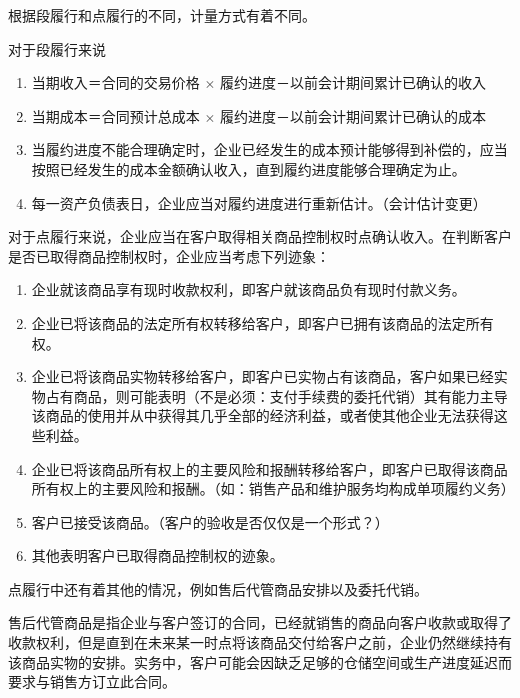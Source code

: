 \documentclass[UTF8,12pt]{ctexart}
\numberwithin{equation}{section} %
\numberwithin{figure}{section}
\numberwithin{table}{section}
\begin{document}
	根据段履行和点履行的不同，计量方式有着不同。
	
	对于段履行来说
	\begin{enumerate}
		\item 当期收入＝合同的交易价格 $\times$ 履约进度－以前会计期间累计已确认的收入
		
		\item 当期成本＝合同预计总成本 $\times$ 履约进度－以前会计期间累计已确认的成本
		
		\item 当履约进度不能合理确定时，企业已经发生的成本预计能够得到补偿的，应当按照已经发生的成本金额确认收入，直到履约进度能够合理确定为止。
		
		\item 每一资产负债表日，企业应当对履约进度进行重新估计。（会计估计变更）
	\end{enumerate}
	
	对于点履行来说，企业应当在客户取得相关商品控制权时点确认收入。在判断客户是否已取得商品控制权时，企业应当考虑下列迹象：
	\begin{enumerate}
		\item 企业就该商品享有现时收款权利，即客户就该商品负有现时付款义务。
		
		\item 企业已将该商品的法定所有权转移给客户，即客户已拥有该商品的法定所有权。
		
		\item 企业已将该商品实物转移给客户，即客户已实物占有该商品，客户如果已经实物占有商品，则可能表明（不是必须：支付手续费的委托代销）其有能力主导该商品的使用并从中获得其几乎全部的经济利益，或者使其他企业无法获得这些利益。
		
		\item 企业已将该商品所有权上的主要风险和报酬转移给客户，即客户已取得该商品所有权上的主要风险和报酬。（如：销售产品和维护服务均构成单项履约义务）
		
		\item 客户已接受该商品。（客户的验收是否仅仅是一个形式？）
		
		\item 其他表明客户已取得商品控制权的迹象。
	\end{enumerate}

	点履行中还有着其他的情况，例如售后代管商品安排以及委托代销。
	
	售后代管商品是指企业与客户签订的合同，已经就销售的商品向客户收款或取得了收款权利，但是直到在未来某一时点将该商品交付给客户之前，企业仍然继续持有该商品实物的安排。实务中，客户可能会因缺乏足够的仓储空间或生产进度延迟而要求与销售方订立此合同。
	
\end{document}
